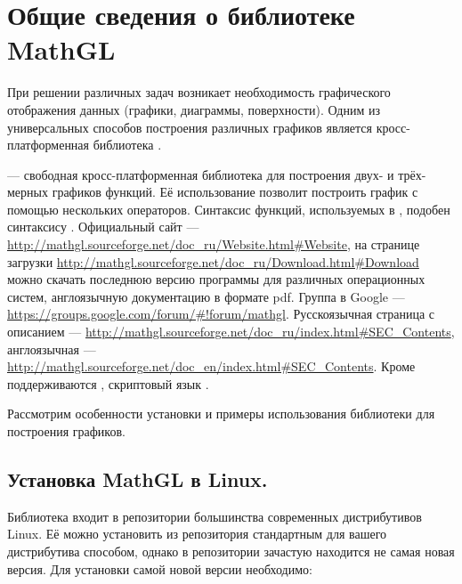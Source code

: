 \chapter[Общие сведения о библиотеке MathGL]{Общие сведения о библиотеке MathGL}
При решении различных задач возникает необходимость графического отображения данных (графики, диаграммы, поверхности).
Одним из универсальных способов построения различных графиков является кросс-платформенная библиотека .

 --- свободная кросс-платформенная библиотека для построения двух- и трёх-мерных 
графиков функций. Её использование позволит построить график с помощью нескольких операторов. Синтаксис функций,
используемых в , подобен синтаксису . Официальный сайт --- 
\url{http://mathgl.sourceforge.net/doc_ru/Website.html#Website}, на странице загрузки
\url{http://mathgl.sourceforge.net/doc_ru/Download.html#Download} можно скачать последнюю версию программы для различных
операционных систем, англоязычную документацию в формате pdf. Группа в Google --- \url{https://groups.google.com/forum/#!forum/mathgl}.
Русскоязычная страница с описанием --- \url{http://mathgl.sourceforge.net/doc_ru/index.html#SEC_Contents}, англоязычная ---
\url{http://mathgl.sourceforge.net/doc_en/index.html#SEC_Contents}. Кроме  поддерживаются , скриптовый язык .

Рассмотрим особенности установки и примеры использования библиотеки для построения графиков.

\section{Установка MathGL в Linux.}
Библиотека входит в репозитории большинства современных дистрибутивов Linux. Её можно установить из репозитория
стандартным для вашего дистрибутива способом, однако в репозитории зачастую находится не самая новая версия. Для установки самой
новой версии необходимо:

